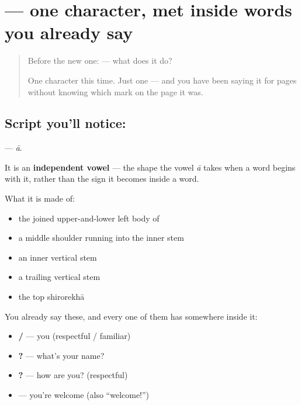 \section[\texorpdfstring{\hi{आ} (ā)}{आ (ā)}]{ — one character, met inside words you already say}

\label{lesson:HI-S04-letter-aa}



\begin{quote}
Before the new one:  — what does it do?

One character this time. Just one — and you have been saying it for pages without knowing which mark on the page it was.
\end{quote}

\subsection*{Script you'll notice: }
\textbf{} — \emph{ā}.

It is an \textbf{independent vowel} — the shape the vowel \emph{ā} takes when a word begins with it, rather than the sign it becomes inside a word.

What it is made of:

\begin{itemize}
\raggedright
  \item the joined upper-and-lower left body of 
  \item a middle shoulder running into the inner stem
  \item an inner vertical stem
  \item a trailing vertical stem
  \item the top shirorekhā
\end{itemize}

You already say these, and every one of them has  somewhere inside it:

\begin{itemize}
\raggedright
  \item \textbf{ / } — you (respectful / familiar)
  \item \textbf{   ?} — what's your name?
  \item \textbf{  ?} — how are you? (respectful)
  \item \textbf{  } — you're welcome (also \textquotedblleft{}welcome!\textquotedblright{})
\end{itemize}


